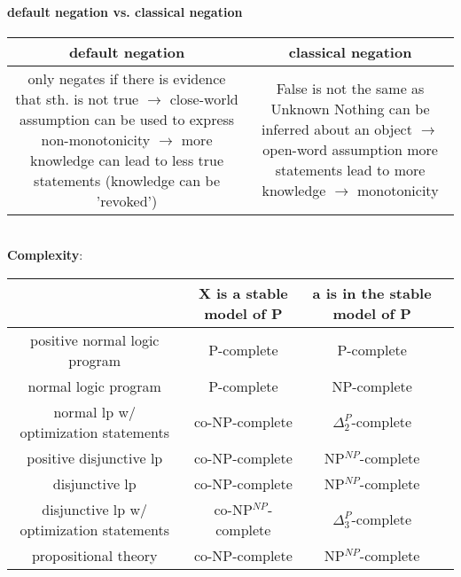 \documentclass[12pt,a4paper]{article}
\newcommand{\nl}{\\[0.1cm]}
\begin{document}
\paragraph{default negation vs. classical negation}
\flushleft
\begin{tabular}{|c|c|}
\hline
\textbf{default negation} & \textbf{classical negation}\\
\hline 
\pbox{10cm}{only negates if there is\\evidence that sth. is not true\\$\rightarrow$ close-world assumption\\
can be used to express non-monotonicity\\$\rightarrow$ more knowledge can lead to less true statements\\(knowledge can be 'revoked')} & \pbox{10cm}{False is not the same as Unknown\\Nothing can be inferred about an object\\$\rightarrow$ open-word assumption\\
more statements lead to more knowledge\\$\rightarrow$ monotonicity}\\
\hline
\end{tabular}
\nl
\textbf{Complexity}:\\
\begin{tabular}{|c|c|c|c|}
\hline
& X is a stable model of P & a is in the stable model of P\\
\hline
positive normal logic program & P-complete & P-complete\\
normal logic program & P-complete & NP-complete\\
normal lp w/ optimization statements & co-NP-complete & $\Delta^P_2$-complete\\
positive disjunctive lp & co-NP-complete & NP$^{NP}$-complete\\
disjunctive lp & co-NP-complete & NP$^{NP}$-complete\\
disjunctive lp w/ optimization statements & co-NP$^{NP}$-complete & $\Delta^P_3$-complete\\
propositional theory & co-NP-complete & NP$^{NP}$-complete\\
\hline


\end{tabular}
\end{document}
